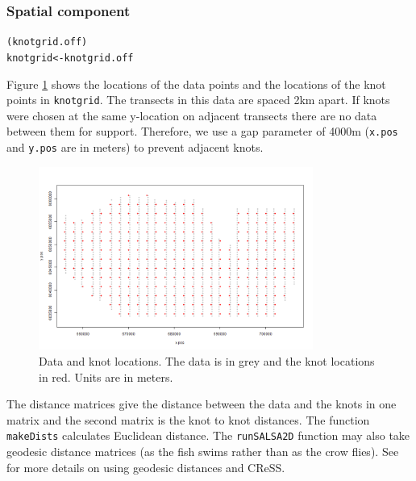 \begin{frame}[fragile]
\frametitle{Spatial component}
\begin{knitrout}\footnotesize
{}\color{fgcolor}\begin{kframe}
\begin{alltt}
(knotgrid.off)
knotgrid <- knotgrid.off
\end{alltt}
\end{kframe}
\end{knitrout}

\label{gappage}
\noindent Figure \ref{fig:knotgrid} shows the locations of the data points and the locations of the knot points in {\tt knotgrid}.  The transects in this data are spaced 2km apart.  If knots were chosen at the same y-location on adjacent transects there are no data between them for support.  Therefore, we use a gap parameter of 4000m ({\tt x.pos} and {\tt y.pos} are in meters) to prevent adjacent knots.

\begin{figure}[h]
	\centering
	\includegraphics[width=9cm]{danish/knotgrid.png}
	\caption{Data and knot locations.  The data is in grey and the knot locations in red.  Units are in meters.}
	\label{fig:knotgrid}
\end{figure}

\noindent The distance matrices give the distance between the data and the knots in one matrix and the second matrix is the knot to knot distances.  The function {\tt makeDists} calculates Euclidean distance. The {\tt runSALSA2D} function may also take geodesic distance matrices (as the fish swims rather than as the crow flies).  See \citet{ScottH2013} for more details on using geodesic distances and CReSS.


\end{frame}
